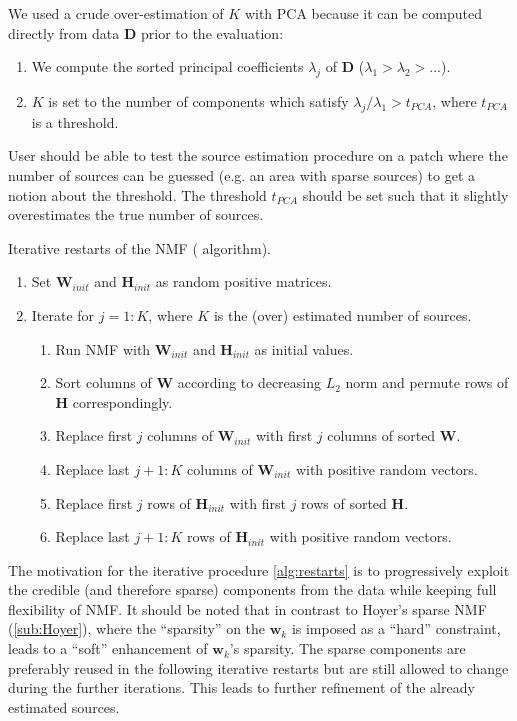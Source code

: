 We used a crude over-estimation of $K$ with PCA because it can be computed directly from data $\bm{D}$ prior to the evaluation: 
%
\begin{enumerate}
	\item
	We compute the sorted principal coefficients $\lambda_j$ of $\bm{D}$ ($\lambda_1>\lambda_2>...$). 
	\item
	$K$ is set to the number of components which satisfy $\lambda_j/\lambda_1>t_{PCA}$, where $t_{PCA}$ is a threshold. 
\end{enumerate}
%
User should be able to test the source estimation procedure on a patch where the number of sources can be guessed (e.g. an area with sparse sources) to get a notion about the threshold. The threshold $t_{PCA}$ should be set such that it slightly overestimates the true number of sources.

\begin{algorithm}[hbt]
	\caption{Iterative restarts of the NMF (\inmf{} algorithm).}	
	\label{alg:restarts}
	\begin{enumerate}
		\item Set $\bm{W}_{init}$ and $\bm{H}_{init}$ as random positive matrices.
		\item Iterate for $j=1:K$, where $K$ is the (over) estimated number of sources.
		\begin{enumerate}
			\item Run NMF with $\bm{W}_{init}$ and $\bm{H}_{init}$ as initial values.
			\item Sort columns of $\bm{W}$ according to decreasing $L_2$ norm and permute rows of $\bm{H}$ correspondingly.
			\item Replace first $j$ columns of $\bm{W}_{init}$ with first $j$ columns of sorted $\bm{W}$.
			\item Replace last $j+1:K$ columns of $\bm{W}_{init}$ with positive random vectors.
			\item Replace first $j$ rows of $\bm{H}_{init}$ with first $j$ rows of sorted $\bm{H}$.
			\item Replace last $j+1:K$ rows of $\bm{H}_{init}$ with positive random vectors.
		\end{enumerate}
	\end{enumerate}    
\end{algorithm}

The motivation for the iterative procedure \autoref{alg:restarts} is to progressively exploit the credible (and therefore sparse) components from the data while keeping full flexibility of NMF. It should be noted that in contrast to Hoyer's sparse NMF (\autoref{sub:Hoyer}), where the ``sparsity'' on the $\bm{w}_k$ is imposed as a ``hard'' constraint, \inmf{} leads to a ``soft'' enhancement of $\bm{w}_k$'s sparsity. The sparse components are preferably reused in the following iterative restarts but are still allowed to change during the further iterations. This leads to further refinement of the already estimated sources. 

